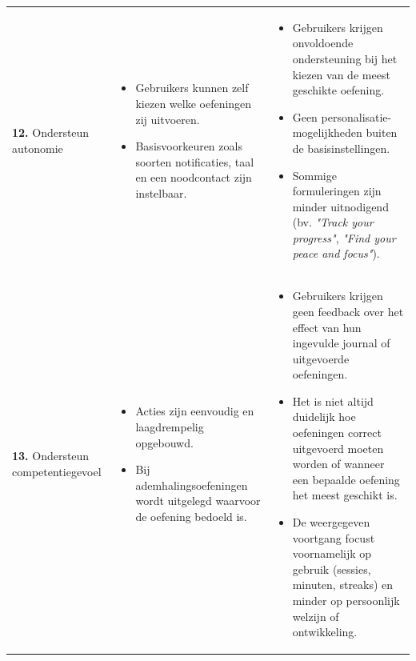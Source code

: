 {\begin{longtable}{
            >{\raggedright\arraybackslash}p{5.23cm}
            >{\raggedright\arraybackslash}p{4.93cm}
            >{\raggedright\arraybackslash}p{4.93cm}
        }
        \textbf{12.} Ondersteun autonomie
        & 
        \begin{itemize}[nosep,leftmargin=*,itemsep=10pt]
            \renewcommand{\labelitemi}{+}
            \item Gebruikers kunnen zelf kiezen welke oefeningen zij uitvoeren.
            \item Basisvoorkeuren zoals soorten notificaties, taal en een noodcontact zijn instelbaar.
        \end{itemize}
        & 
        \begin{itemize}[nosep,leftmargin=*,itemsep=10pt]
            \renewcommand{\labelitemi}{-}
            \item Gebruikers krijgen onvoldoende ondersteuning bij het kiezen van de meest geschikte oefening.
            \item Geen personalisatie- mogelijkheden buiten de basisinstellingen.
            \item Sommige formuleringen zijn minder uitnodigend (bv. \textit{"Track your progress"}, \textit{"Find your peace and focus"}).
        \end{itemize}
        \\
        
        \addlinespace[5pt]
        
        \textbf{13.} Ondersteun competentiegevoel
        & 
        \begin{itemize}[nosep,leftmargin=*,itemsep=10pt]
            \renewcommand{\labelitemi}{+}
            \item Acties zijn eenvoudig en laagdrempelig opgebouwd.
            \item Bij ademhalingsoefeningen wordt uitgelegd waarvoor de oefening bedoeld is.
        \end{itemize}
        & 
        \begin{itemize}[nosep,leftmargin=*,itemsep=10pt]
            \renewcommand{\labelitemi}{-}
            \item Gebruikers krijgen geen feedback over het effect van hun ingevulde journal of uitgevoerde oefeningen.
            \item Het is niet altijd duidelijk hoe oefeningen correct uitgevoerd moeten worden of wanneer een bepaalde oefening het meest geschikt is.
            \item De weergegeven voortgang focust voornamelijk op gebruik (sessies, minuten, streaks) en minder op persoonlijk welzijn of ontwikkeling.
        \end{itemize}
        \\
        

\end{longtable}}
